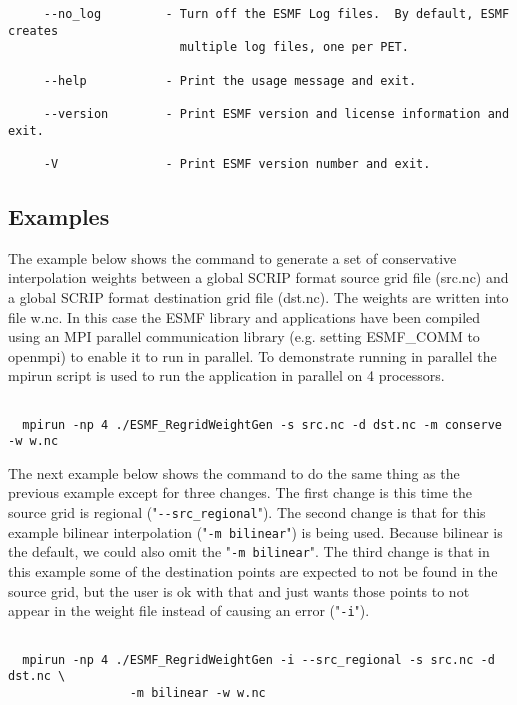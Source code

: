 \begin{verbatim}
     --no_log         - Turn off the ESMF Log files.  By default, ESMF creates 
                        multiple log files, one per PET.

     --help           - Print the usage message and exit.

     --version        - Print ESMF version and license information and exit.

     -V               - Print ESMF version number and exit.
\end{verbatim}


\subsection{Examples}

The example below shows the command to generate a set of conservative interpolation weights between a global
SCRIP format source grid file (src.nc) and a global SCRIP format destination grid file (dst.nc). The weights
are written into file w.nc. In this case the
ESMF library and applications have been compiled using an MPI parallel communication library
(e.g. setting ESMF\_COMM to openmpi) to enable it to run in parallel. To demonstrate running in parallel
the mpirun script is used to run the application in parallel on 4 processors.

\begin{verbatim}

  mpirun -np 4 ./ESMF_RegridWeightGen -s src.nc -d dst.nc -m conserve -w w.nc

\end{verbatim}

The next example below shows the command to do the same thing as the previous example except for three changes. The first
change is this time the source grid is regional ("{\tt \verb+--+src\_regional}"). The second change is that
for this example bilinear interpolation ("{\tt -m bilinear}") is being used. Because bilinear is the default, we could also
omit the "{\tt -m bilinear}". The third change is that in this example some of the destination points are expected to
not be found in the source grid, but the user is ok with that and just wants those points to not appear in the weight file instead of causing an error ("{\tt -i}").

\begin{verbatim}

  mpirun -np 4 ./ESMF_RegridWeightGen -i --src_regional -s src.nc -d dst.nc \
                 -m bilinear -w w.nc

\end{verbatim}

